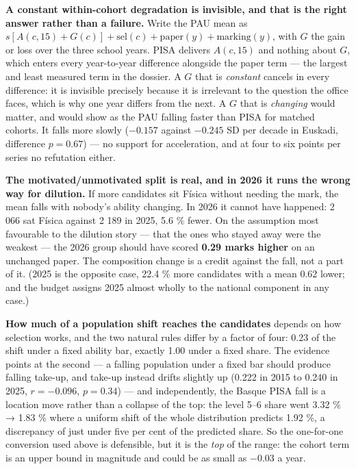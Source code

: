 \documentclass[
  10.5pt,
  a4paper,
  DIV=11,
  numbers=noendperiod]{scrartcl}
\begin{document}
\textbf{A constant within-cohort degradation is invisible, and that is
the right answer rather than a failure.} Write the PAU mean as
\(s[A(c,15) + G(c)] + \mathrm{sel}(c) + \mathrm{paper}(y) + \mathrm{marking}(y)\),
with \(G\) the gain or loss over the three school years. PISA delivers
\(A(c,15)\) and nothing about \(G\), which enters every year-to-year
difference alongside the paper term --- the largest and least measured
term in the dossier. A \(G\) that is \emph{constant} cancels in every
difference: it is invisible precisely because it is irrelevant to the
question the office faces, which is why one year differs from the next.
A \(G\) that is \emph{changing} would matter, and would show as the PAU
falling faster than PISA for matched cohorts. It falls more slowly
(\(-0.157\) against \(-0.245\) SD per decade in Euskadi, difference
\(p = 0.67\)) --- no support for acceleration, and at four to six points
per series no refutation either.

\textbf{The motivated/unmotivated split is real, and in 2026 it runs the
wrong way for dilution.} If more candidates sit Física without needing
the mark, the mean falls with nobody's ability changing. In 2026 it
cannot have happened: 2 066 sat Física against 2 189 in 2025, 5.6 \%
fewer. On the assumption most favourable to the dilution story --- that
the ones who stayed away were the weakest --- the 2026 group should have
scored \textbf{0.29 marks higher} on an unchanged paper. The composition
change is a credit against the fall, not a part of it. (2025 is the
opposite case, 22.4 \% more candidates with a mean 0.62 lower; and the
budget assigns 2025 almost wholly to the national component in any
case.)

\textbf{How much of a population shift reaches the candidates} depends
on how selection works, and the two natural rules differ by a factor of
four: 0.23 of the shift under a fixed ability bar, exactly 1.00 under a
fixed share. The evidence points at the second --- a falling population
under a fixed bar should produce falling take-up, and take-up instead
drifts slightly up (0.222 in 2015 to 0.240 in 2025, \(r = -0.096\),
\(p = 0.34\)) --- and independently, the Basque PISA fall is a location
move rather than a collapse of the top: the level 5--6 share went 3.32
\% → 1.83 \% where a uniform shift of the whole distribution predicts
1.92 \%, a discrepancy of just under five per cent of the predicted
share. So the one-for-one conversion used above is defensible, but it is
the \emph{top} of the range: the cohort term is an upper bound in
magnitude and could be as small as \(-0.03\) a year.
\end{document}
